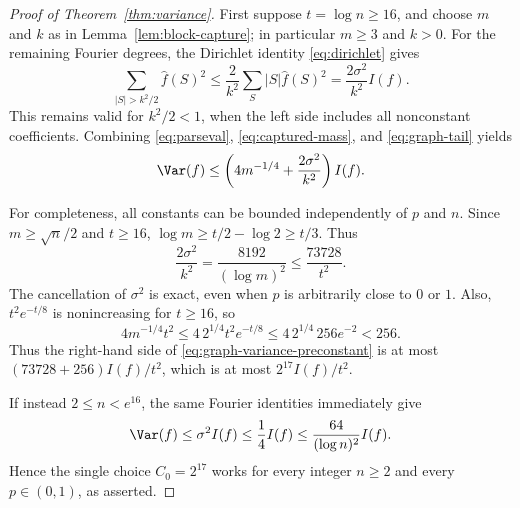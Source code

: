 \begin{proof}[Proof of Theorem~\ref{thm:variance}]
First suppose $t=\log n\ge16$, and choose $m$ and $k$ as in
Lemma~\ref{lem:block-capture}; in particular $m\ge3$ and $k>0$.
For the remaining Fourier degrees, the Dirichlet identity
\eqref{eq:dirichlet} gives
\begin{equation}
 \sum_{|S|>k^2/2}\widehat f(S)^2
 \le\frac2{k^2}\sum_S|S|\widehat f(S)^2
 =\frac{2\sigma^2}{k^2}I(f).
 \label{eq:graph-tail}
\end{equation}
This remains valid for $k^2/2<1$, when the left side includes all
nonconstant coefficients.  Combining \eqref{eq:parseval},
\eqref{eq:captured-mass}, and \eqref{eq:graph-tail} yields
\begin{equation}
 \Var(f)\le
 \left(4m^{-1/4}+\frac{2\sigma^2}{k^2}\right)I(f).
 \label{eq:graph-variance-preconstant}
\end{equation}

For completeness, all constants can be bounded independently of
$p$ and $n$.  Since $m\ge\sqrt n/2$ and $t\ge16$,
$\log m\ge t/2-\log2\ge t/3$.  Thus
\[
 \frac{2\sigma^2}{k^2}
 =\frac{8192}{(\log m)^2}\le\frac{73728}{t^2}.
\]
The cancellation of $\sigma^2$ is exact, even when $p$ is arbitrarily
close to $0$ or $1$.  Also, $t^2e^{-t/8}$ is nonincreasing for
$t\ge16$, so
\[
 4m^{-1/4}t^2
 \le4\,2^{1/4}t^2e^{-t/8}
 \le4\,2^{1/4}\,256e^{-2}<256.
\]
Thus the right-hand side of \eqref{eq:graph-variance-preconstant} is at most
$(73728+256)I(f)/t^2$, which is at most
$2^{17}I(f)/t^2$.

If instead $2\le n<e^{16}$, the same Fourier identities immediately
give
\[
 \Var(f)\le\sigma^2I(f)\le\frac14 I(f)
 \le\frac{64}{(\log n)^2}I(f).
\]
Hence the single choice $C_0=2^{17}$ works for every integer $n\ge2$
and every $p\in(0,1)$, as asserted.
\end{proof}
